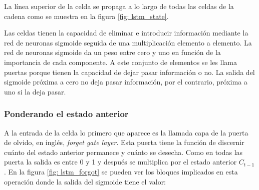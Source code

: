 La línea superior de la celda se propaga a lo largo de todas las celdas de la cadena como se muestra en la figura \ref{fig: lstm_state}.

Las celdas tienen la capacidad de eliminar e introducir información mediante la red de neuronas sigmoide seguida de una multiplicación elemento a elemento. La red de neuronas sigmoide da un peso entre cero y uno en función de la importancia de cada componente. A este conjunto de elementos se les llama puertas porque tienen la capacidad de dejar pasar información o no. La salida del sigmoide próxima a cero no deja pasar información, por el contrario, próxima a uno si la deja pasar.

\subsubsection{Ponderando el estado anterior}
A la entrada de la celda lo primero que aparece es la llamada capa de la puerta de olvido, en inglés, \textit{forget gate layer}. Esta puerta tiene la función de discernir cuánto del estado anterior permanece y cuánto se desecha. Como en todas las puerta la salida es entre 0 y 1 y después se multiplica por el estado anterior $C_{t-1}$. En la figura \ref{fig: lstm_forgot} se pueden ver los bloques implicados en esta operación donde la salida del sigmoide tiene el valor:

